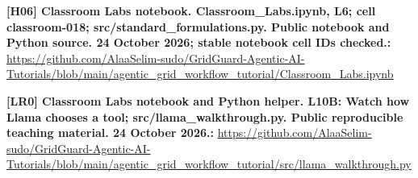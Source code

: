 \documentclass[10pt,letterpaper]{article}
\begin{document}
\textbf{[H06] Classroom Labs notebook. Classroom\_Labs.ipynb, L6; cell classroom-018; src/standard\_formulations.py. Public notebook and Python source. 24 October 2026; stable notebook cell IDs checked.:} \href{https://github.com/AlaaSelim-sudo/GridGuard-Agentic-AI-Tutorials/blob/main/agentic_grid_workflow_tutorial/Classroom_Labs.ipynb}{\small\ttfamily https:/\allowbreak{}/\allowbreak{}github.\allowbreak{}com/\allowbreak{}AlaaSelim-\allowbreak{}sudo/\allowbreak{}GridGuard-\allowbreak{}Agentic-\allowbreak{}AI-\allowbreak{}Tutorials/\allowbreak{}blob/\allowbreak{}main/\allowbreak{}agentic\_\allowbreak{}grid\_\allowbreak{}workflow\_\allowbreak{}tutorial/\allowbreak{}Classroom\_\allowbreak{}Labs.\allowbreak{}ipynb}\par
\textbf{[LR0] Classroom Labs notebook and Python helper. L10B: Watch how Llama chooses a tool; src/llama\_walkthrough.py. Public reproducible teaching material. 24 October 2026.:} \href{https://github.com/AlaaSelim-sudo/GridGuard-Agentic-AI-Tutorials/blob/main/agentic_grid_workflow_tutorial/src/llama_walkthrough.py}{\small\ttfamily https:/\allowbreak{}/\allowbreak{}github.\allowbreak{}com/\allowbreak{}AlaaSelim-\allowbreak{}sudo/\allowbreak{}GridGuard-\allowbreak{}Agentic-\allowbreak{}AI-\allowbreak{}Tutorials/\allowbreak{}blob/\allowbreak{}main/\allowbreak{}agentic\_\allowbreak{}grid\_\allowbreak{}workflow\_\allowbreak{}tutorial/\allowbreak{}src/\allowbreak{}llama\_\allowbreak{}walkthrough.\allowbreak{}py}\par
\par\medskip
\end{document}
